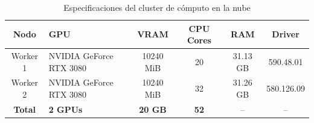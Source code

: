 \begin{table}[htbp]
\centering
\caption{Especificaciones del cluster de cómputo en la nube}
\label{tab:infraestructura}
\small
\begin{tabular}{clcccc}
\toprule
\textbf{Nodo} & \textbf{GPU} & \textbf{VRAM} & \textbf{CPU Cores} & \textbf{RAM} & \textbf{Driver} \\
\midrule
  Worker 1 & NVIDIA GeForce RTX 3080 & 10240 MiB & 20 & 31.13 GB & 590.48.01 \\
  Worker 2 & NVIDIA GeForce RTX 3080 & 10240 MiB & 32 & 31.26 GB & 580.126.09 \\
\midrule
  \textbf{Total} & \textbf{2 GPUs} & \textbf{20 GB} & \textbf{52} & -- & -- \\
\bottomrule
\end{tabular}
\end{table}